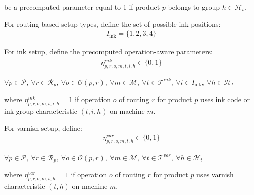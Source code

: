 \documentclass{article}
\begin{document}
be a precomputed parameter equal to 1 if product $p$ belongs to group $h \in \mathcal{H}_t$.

For routing-based setup types, define the set of possible ink positions:
\begin{align}
I_{\text{ink}} = \{1,2,3,4\}
\end{align}

For ink setup, define the precomputed operation-aware parameters:
\begin{align}
\eta^{ink}_{p,r,o,m,t,i,h} \in \{0,1\}
\end{align}

\begin{center}
$\forall p \in \mathcal{P},\ 
\forall r \in \mathcal{R}_p,\ 
\forall o \in \mathcal{O}(p,r),\ 
\forall m \in \mathcal{M},\ 
\forall t \in \mathcal{T}^{ink},\ 
\forall i \in I_{\text{ink}},\ 
\forall h \in \mathcal{H}_t$
\end{center}

where $\eta^{ink}_{p,r,o,m,t,i,h}=1$ if operation $o$ of routing $r$ for product $p$ uses ink code or ink group characteristic $(t,i,h)$ on machine $m$.

For varnish setup, define:
\begin{align}
\eta^{var}_{p,r,o,m,t,h} \in \{0,1\}
\end{align}

\begin{center}
$\forall p \in \mathcal{P},\ 
\forall r \in \mathcal{R}_p,\ 
\forall o \in \mathcal{O}(p,r),\ 
\forall m \in \mathcal{M},\ 
\forall t \in \mathcal{T}^{var},\ 
\forall h \in \mathcal{H}_t$
\end{center}

where $\eta^{var}_{p,r,o,m,t,h}=1$ if operation $o$ of routing $r$ for product $p$ uses varnish characteristic $(t,h)$ on machine $m$.

\begingroup
\small
\setlength{\LTleft}{0pt}
\setlength{\LTright}{0pt}
\setlength{\tabcolsep}{4pt}
\renewcommand{\arraystretch}{1.15}
\end{document}
